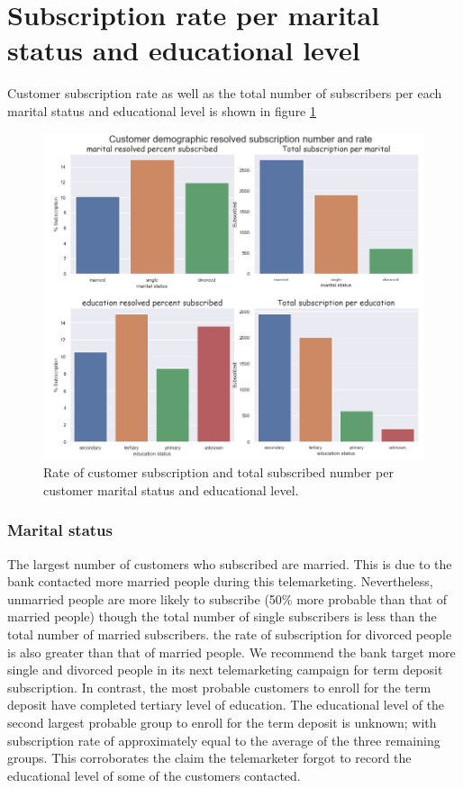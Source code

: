 \section{Subscription rate per marital status and educational level}
Customer subscription rate as well as the total number of subscribers per each marital status and educational level is shown in figure \ref{fig:marital_education_rate}
\begin{figure}[tbh]
\centering
\includegraphics[width = 1.0\hsize]{./resources/img/fig_marital_education_rate.png}
\caption{Rate of customer subscription and total subscribed number per customer marital status and educational level.} 
\label{fig:marital_education_rate}
\end{figure}

\subsubsection*{Marital status}
The largest number of customers who subscribed are married. This is due to the bank contacted more married people during this telemarketing. Nevertheless, unmarried people are more likely to subscribe (50\% more probable than that of married people) though the total number of single subscribers is less than the total number of married subscribers. the rate of subscription for divorced people is also greater than that of married people. We recommend the bank target more single and divorced people in its next telemarketing campaign for term deposit subscription. In contrast, the most probable customers to enroll for the term deposit have completed tertiary level of education. The educational level of the second largest probable group to enroll for the term deposit is unknown; with subscription rate of approximately equal to the average of the three remaining groups. This corroborates the claim the telemarketer forgot to record the educational level of some of the customers contacted.

